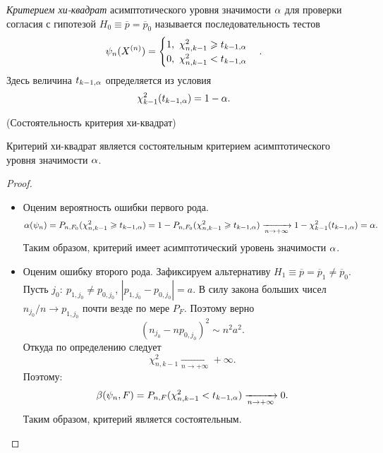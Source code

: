 \begin{definition}
    \textit{Критерием хи-квадрат} асимптотического уровня значимости $\alpha$
    для проверки согласия с гипотезой $H_0 \equiv \overline{p} = \overline{p}_0$
    называется последовательность тестов
    \[
        \psi_n(X^{(n)}) = \begin{cases}
            1,~ \chi^2_{n, k - 1} \geqslant t_{k - 1, \alpha} \\
            0,~ \chi^2_{n, k - 1} < t_{k - 1, \alpha}
        \end{cases}
    .\]
    Здесь величина $t_{k - 1, \alpha}$ определяется из условия
    \[
        \chi^2_{k - 1}(t_{k - 1, \alpha}) = 1 - \alpha
    .\]
\end{definition}

\begin{theorem}(Состоятельность критерия хи-квадрат)
   
    Критерий хи-квадрат является состоятельным критерием асимптотического
    уровня значимости $\alpha$.
\end{theorem}
\begin{proof}
    \enewline
    \begin{itemize}
        \item Оценим вероятность ошибки первого рода. 
            \[
                \alpha(\psi_n) = P_{n, F_0}(\chi^2_{n, k - 1} \geqslant 
                t_{k - 1, \alpha}) = 1 - P_{n, F_0}(\chi^2_{n, k - 1} \geqslant 
                t_{k - 1, \alpha}) \xrightarrow[n \to +\infty]{} 1 - 
                \chi^2_{k - 1}(t_{k - 1, \alpha}) = \alpha
            .\]
            Таким образом, критерий имеет асимптотический уровень значимости 
            $\alpha$. 
        \item Оценим ошибку второго рода. Зафиксируем альтернативу
            $H_1 \equiv \overline{p} = \overline{p}_1 \neq \overline{p}_0$. 
            Пусть $j_0\colon~ p_{1, j_0} \neq p_{0, j_0}$, $|p_{1, j_0} 
            - p_{0, j_0}| = a$. В силу закона больших чисел $n_{j_0} / n
            \to p_{1, j_0}$ почти везде по мере $P_F$. Поэтому верно
            \[
                (n_{j_0} - np_{0, j_0})^2 \sim n^2a^2
            .\]
            Откуда по определению следует
            \[
                \chi^2_{n, k - 1} \xrightarrow[n \to +\infty]{} +\infty
            .\]
            Поэтому:
            \[
                \beta(\psi_n, F) = P_{n, F}(\chi^2_{n, k - 1} < t_{k - 1, \alpha}) 
                \xrightarrow[n \to +\infty]{} 0
            .\]
            Таким образом, критерий является состоятельным. 
    \end{itemize}
\end{proof}

